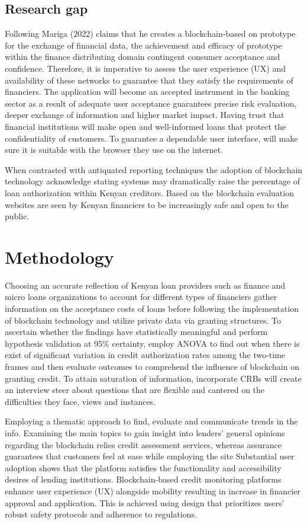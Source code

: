 \documentclass[a4paper]{article}
\begin{document}
\subsection{Research gap}
Following Mariga (2022) claims that he creates a blockchain-based on prototype for the exchange of financial data, the achievement and efficacy of prototype within the finance distributing domain contingent consumer acceptance and confidence. Therefore, it is imperative to assess the user experience (UX) and availability of these networks to guarantee that they satisfy the requirements of financiers. The application will become an accepted instrument in the banking sector as a result of adequate user acceptance guarantees precise risk evaluation, deeper exchange of information and higher market impact. Having trust that financial institutions will make open and well-informed loans that protect the confidentiality of customers. To guarantee a dependable user interface, will make sure it is suitable with the browser they use on the internet.

When contrasted with antiquated reporting techniques the adoption of blockchain technology acknowledge stating systems may dramatically raise the percentage of loan authorization within Kenyan creditors. Based on the blockchain evaluation websites are seen by Kenyan financiers to be increasingly safe and open to the public.

\section{Methodology}
Choosing an accurate reflection of Kenyan loan providers such as finance and micro loans organizations to account for different types of financiers gather information on the acceptance costs of loans before following the implementation of blockchain technology and utilize private data via granting structures. To ascertain whether the findings have statistically meaningful and perform hypothesis validation at 95\% certainty, employ ANOVA to find out when there is exist of significant variation in credit authorization rates among the two-time frames and then evaluate outcomes to comprehend the influence of blockchain on granting credit. To attain saturation of information, incorporate CRBs will create an interview steer about questions that are flexible and cantered on the difficulties they face, views and instances.

Employing a thematic approach to find, evaluate and communicate trends in the info. Examining the main topics to gain insight into lenders' general opinions regarding the blockchain relies credit assessment services, whereas assurance guarantees that customers feel at ease while employing the site Substantial user adoption shows that the platform satisfies the functionality and accessibility desires of lending institutions. Blockchain-based credit monitoring platforms enhance user experience (UX) alongside mobility resulting in increase in financier approval and application. This is achieved using design that prioritizes users’ robust safety protocols and adherence to regulations.
\end{document}
